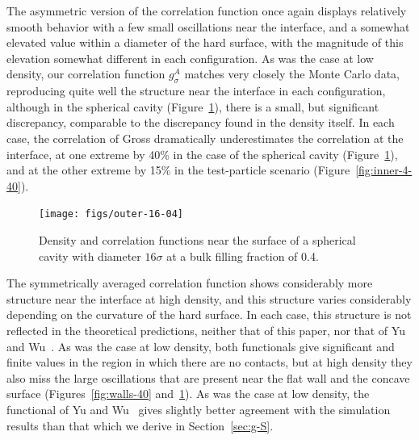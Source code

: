 \documentclass[letterpaper,amsmath,amssymb,10pt,pre]{revtex4-1}
\begin{document}
The asymmetric version of the correlation function once again displays
relatively smooth behavior with a few small
oscillations near the interface, and a somewhat elevated value within
a diameter of the hard surface, with the magnitude of this elevation
somewhat different in each configuration.  As was the case at low
density, our correlation function $g_\sigma^A$ matches very closely
the Monte Carlo data, reproducing quite well the structure near the
interface in each configuration, although in the spherical cavity
(Figure~\ref{fig:outer-40}), there is a small, but significant
discrepancy, comparable to the discrepancy found in the density
itself.  In each case, the correlation of Gross dramatically
underestimates the correlation at the interface, at one extreme by
40\% in the case of the spherical cavity
(Figure~\ref{fig:outer-40}), and at the other extreme by 15\%
in the test-particle scenario (Figure~\ref{fig:inner-4-40}).

\begin{figure}
  \texttt{[image: figs/outer-16-04]}
  \caption{Density and correlation functions near the surface of a
    spherical cavity with diameter $16\sigma$ at a bulk filling
    fraction of 0.4.}
  \label{fig:outer-40}
\end{figure}

The symmetrically averaged correlation function shows considerably
more structure near the interface at high density, and this structure
varies considerably depending on the curvature of the hard surface.
In each case, this structure is not reflected in the theoretical
predictions, neither that of this paper, nor that of Yu and
Wu~\cite{yu2002fmt-dft-inhomogeneous-associating}.  As was the case at
low density, both functionals give significant and finite values in
the region in which there are no contacts, but at high density they
also miss the large oscillations that are present near the flat wall
and the concave surface (Figures~\ref{fig:walls-40}
and~\ref{fig:outer-40}).  As was the case at low density, the
functional of Yu and Wu~\cite{yu2002fmt-dft-inhomogeneous-associating}
gives slightly better agreement with the simulation results than that
which we derive in Section~\ref{sec:g-S}.

\end{document}
